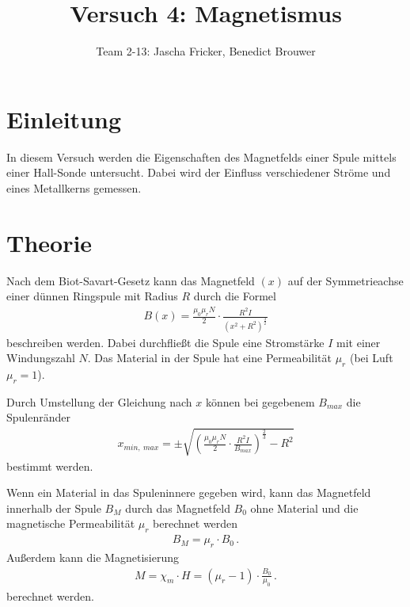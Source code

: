 \documentclass[11pt, a4paper]{article}
\title{Versuch 4: Magnetismus}
\author{Team 2-13: Jascha Fricker, Benedict Brouwer}
\begin{document}
    \maketitle

    \tableofcontents

    \newpage

    \section{Einleitung}

    In diesem Versuch werden die Eigenschaften des Magnetfelds einer Spule mittels einer Hall-Sonde untersucht. Dabei wird der Einfluss verschiedener Ströme und eines Metallkerns gemessen.

    \section{Theorie}

    Nach dem Biot-Savart-Gesetz kann das Magnetfeld $(x)$ auf der Symmetrieachse einer dünnen Ringspule mit Radius $R$ durch die Formel
    \begin{align}
        B(x) = \frac{\mu_0 \mu_r N}{2} \cdot \frac{R^2 I}{\left(x^2 + R^2\right)^{\frac{3}{2}}} \label{eq:BiotSavart}
    \end{align}
    beschreiben werden. Dabei durchfließt die Spule eine Stromstärke $I$ mit einer Windungszahl $N$. Das Material in der Spule hat eine Permeabilität $\mu_r$ (bei Luft $\mu_r = 1$).
    
    Durch Umstellung der Gleichung nach $x$ können bei gegebenem $B_{max}$ die Spulenränder
    \begin{align}
        x_{min, \ max} = \pm \sqrt{\left(\frac{\mu_0 \mu_r N}{2} \cdot \frac{R^2 I}{B_{max}}\right)^\frac{2}{3} - R^2} \label{eq:bmax}
    \end{align}
    bestimmt werden.

    Wenn ein Material in das Spuleninnere gegeben wird, kann das Magnetfeld innerhalb der Spule $B_M$ durch das Magnetfeld $B_0$ ohne Material und die magnetische Permeabilität $\mu_r$ berechnet werden
    \begin{align}
        B_M = \mu_r \cdot B_0 \,. \label{eq:B_M}
    \end{align}
    Außerdem kann die Magnetisierung
    \begin{align}
        M = \chi_m \cdot H = (\mu_r - 1) \cdot \frac{B_0}{\mu_0} \,. \label{eq:magnet}
    \end{align}
    berechnet werden.
\end{document}
